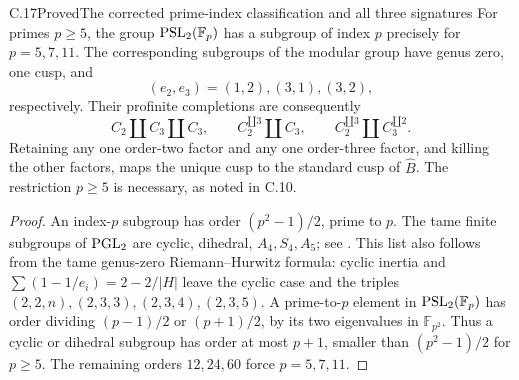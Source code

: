 \begin{statement}{C.17}{Proved}{The corrected prime-index classification and all three signatures}
For primes $p\geq5$, the group $\operatorname{PSL}_2(\mathbb F_p)$ has a
subgroup of index $p$ precisely for $p=5,7,11$. The corresponding
subgroups of the modular group have genus zero, one cusp, and
\[
 (e_2,e_3)=(1,2),(3,1),(3,2),
\]
respectively. Their profinite completions are consequently
\[
 C_2\amalg C_3\amalg C_3,\qquad
 C_2^{\amalg3}\amalg C_3,\qquad
 C_2^{\amalg3}\amalg C_3^{\amalg2}.
\]
Retaining any one order-two factor and any one order-three
factor, and killing the other factors, maps the unique cusp
to the standard cusp of $\widehat B$.
The restriction $p\geq5$ is necessary, as noted in C.10.
\end{statement}
\begin{proof}
An index-$p$ subgroup has order $(p^2-1)/2$, prime to $p$.
The tame finite subgroups of $\operatorname{PGL}_2$ are cyclic, dihedral,
$A_4,S_4,A_5$; see \cite[Introduction and Proposition 1.1]{PBC_Beauville2010}.
This list also follows from the tame genus-zero
Riemann--Hurwitz formula: cyclic inertia and
$\sum(1-1/e_i)=2-2/|H|$ leave the cyclic case and the
triples $(2,2,n),(2,3,3),(2,3,4),(2,3,5)$.
A prime-to-$p$ element in $\operatorname{PSL}_2(\mathbb F_p)$ has order
dividing $(p-1)/2$ or $(p+1)/2$, by its two eigenvalues in
$\mathbb F_{p^2}$. Thus a cyclic or dihedral subgroup has
order at most $p+1$, smaller than $(p^2-1)/2$ for $p\geq5$.
The remaining orders $12,24,60$ force $p=5,7,11$.


\end{proof}
